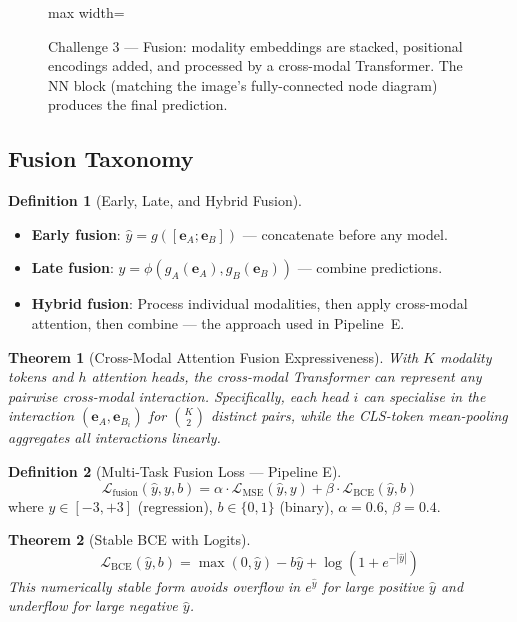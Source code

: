 \documentclass[12pt,a4paper]{article}
\theoremstyle{definition}
\newtheorem{definition}{Definition}[section]
\theoremstyle{plain}
\newtheorem{theorem}{Theorem}[section]
\theoremstyle{remark}
\newcommand{\eA}{\mathbf{e}_A}
\newcommand{\eB}{\mathbf{e}_B}
\begin{document}
\begin{figure}[H]
\begin{adjustbox}{max width=\textwidth}
\end{adjustbox}
\caption{Challenge 3 — Fusion: modality embeddings are stacked, positional encodings added, and processed by a cross-modal Transformer. The NN block (matching the image's fully-connected node diagram) produces the final prediction.}
\label{fig:fusion}
\end{figure}

\subsection{Fusion Taxonomy}

\begin{definition}[Early, Late, and Hybrid Fusion]
\begin{itemize}[nosep]
  \item \textbf{Early fusion}: $\hat{y} = g([\eA; \eB])$ — concatenate before any model.
  \item \textbf{Late fusion}: $\hat{y} = \phi(g_A(\eA), g_B(\eB))$ — combine predictions.
  \item \textbf{Hybrid fusion}: Process individual modalities, then apply cross-modal attention, then combine — the approach used in Pipeline~E.
\end{itemize}
\end{definition}

\begin{theorem}[Cross-Modal Attention Fusion Expressiveness]
With $K$ modality tokens and $h$ attention heads, the cross-modal Transformer can represent any pairwise cross-modal interaction. Specifically, each head $i$ can specialise in the interaction $(\eA, \eB_i)$ for $\binom{K}{2}$ distinct pairs, while the CLS-token mean-pooling aggregates all interactions linearly.
\end{theorem}

\begin{definition}[Multi-Task Fusion Loss — Pipeline E]
\[
  \mathcal{L}_{\text{fusion}}(\hat{y}, y, b) = \alpha \cdot \mathcal{L}_{\text{MSE}}(\hat{y}, y) + \beta \cdot \mathcal{L}_{\text{BCE}}(\hat{y}, b)
\]
where $y \in [-3,+3]$ (regression), $b \in \{0,1\}$ (binary), $\alpha=0.6$, $\beta=0.4$.
\end{definition}

\begin{theorem}[Stable BCE with Logits]
\[
  \mathcal{L}_{\text{BCE}}(\hat{y}, b) = \max(0, \hat{y}) - b\hat{y} + \log(1 + e^{-|\hat{y}|})
\]
This numerically stable form avoids overflow in $e^{\hat{y}}$ for large positive $\hat{y}$ and underflow for large negative $\hat{y}$.
\end{theorem}
\end{document}
